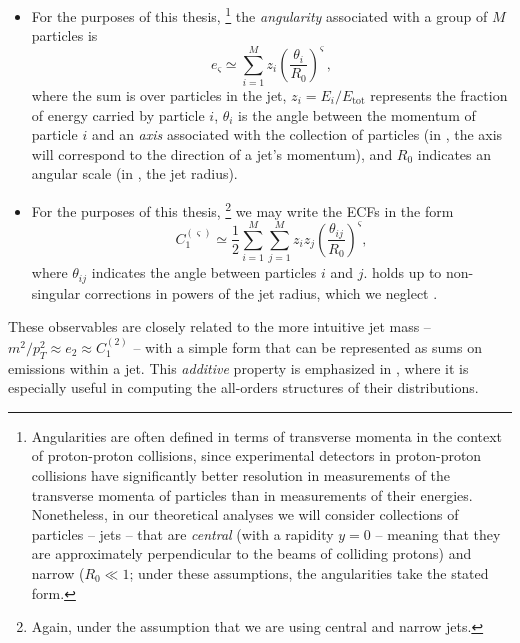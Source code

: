 \begin{itemize}
    \item

    For the purposes of this thesis,%
    \footnote{
        Angularities are often defined in terms of transverse momenta in the context of proton-proton collisions, since experimental detectors in proton-proton collisions have significantly better resolution in measurements of the transverse momenta of particles than in measurements of their energies.
        Nonetheless, in our theoretical analyses we will consider collections of particles -- jets -- that are \emph{central} (with a rapidity \(y = 0\) -- meaning that they are approximately perpendicular to the beams of colliding protons) and narrow (\(R_0 \ll 1\);
        under these assumptions, the angularities take the stated form.
    }
    the \emph{angularity} associated with a group of \(M\) particles is
    \begin{equation}
        e_{\varsigma}
        \simeq
        \sum_{i=1}^M
        z_i \left(\frac{\theta_{i}}{R_0}\right)^\varsigma
        \label{eq:angularitydefn_lo}
        \,,
    \end{equation}
    where the sum is over particles in the jet, \(z_i = E_i / E_\text{tot}\) represents the fraction of energy carried by particle \(i\), \(\theta_i\) is the angle between the momentum of particle \(i\) and an \textit{axis} associated with the collection of particles (in , the axis will correspond to the direction of a jet's momentum), and \(R_0\) indicates an angular scale (in , the jet radius).

    \item

    For the purposes of this thesis,%
    \footnote{Again, under the assumption that we are using central and narrow jets.}
    we may write the ECFs in the form
    \begin{equation}
        C_1^{(\varsigma)}
        \simeq
        \frac{1}{2}\sum_{i=1}^M\sum_{j=1}^M
        z_i z_j \left(\frac{\theta_{ij}}{R_0}\right)^\varsigma
        \label{eq:GECFdefn_lo}
        ,
    \end{equation}
    where \(\theta_{ij}\) indicates the angle between particles \(i\) and \(j\).
     holds up to non-singular corrections in powers of the jet radius, which we neglect \cite{Larkoski:2014wba}.
\end{itemize}
%
These observables are closely related to the more intuitive jet mass -- \(m^2 / p_T^2 \approx e_2 \approx C_1^{(2)}\) -- with a simple form that can be represented as sums on emissions within a jet.
%
This \textit{additive} property is emphasized in , where it is especially useful in computing the all-orders structures of their distributions.


